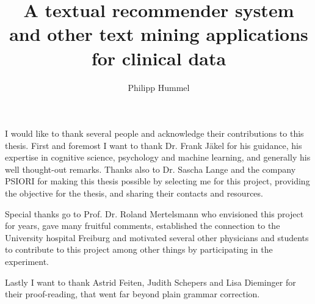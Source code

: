 \documentclass[11pt, twoside, openright, utf8, bachelor, english, subfiles]{base/thesis}
\institute{Institute of Cognitive Science}
\title{A textual recommender system and other text mining applications for clinical data}
\author{Philipp Hummel}
\begin{document}
\maketitle

\begin{abstract}

\end{abstract}

\begin{acknowledgements}
I would like to thank several people and acknowledge their contributions to this thesis. First and foremost I want to thank Dr. Frank Jäkel for his guidance, his expertise in cognitive science, psychology and machine learning, and generally his well thought-out remarks. Thanks also to Dr. Sascha Lange and the company PSIORI for making this thesis possible by selecting me for this project, providing the objective for the thesis, and sharing their contacts and resources.

Special thanks go to Prof. Dr. Roland Mertelsmann who envisioned this project for years, gave many fruitful comments, established the connection to the University hospital Freiburg and motivated several other physicians and students to contribute to this project among other things by participating in the experiment.

Lastly I want to thank Astrid Feiten, Judith Schepers and Lisa Dieminger for their proof-reading, that went far beyond plain grammar correction.
\end{acknowledgements}

\tableofcontents

\mainpart






%
%
%
%

\appendix






\declaration
\end{document}
